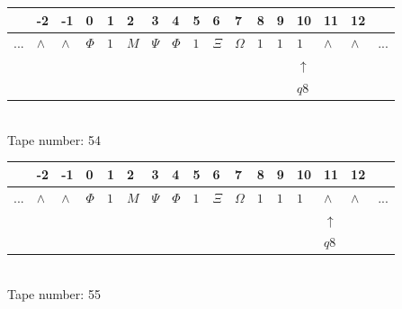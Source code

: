 \documentclass[11pt]{article}
\begin{document}
\begin{table}[H]
\centering
\begin{tabular}{lllllllllllllllll}
 & -2 & -1 & 0 & 1 & 2 & 3 & 4 & 5 & 6 & 7 & 8 & 9 & 10 & 11 & 12 & \\
\hline
$...$ & \multicolumn{1}{|l|}{$\wedge$} & \multicolumn{1}{|l|}{$\wedge$} & \multicolumn{1}{|l|}{$\Phi$} & \multicolumn{1}{|l|}{$1$} & \multicolumn{1}{|l|}{$M$} & \multicolumn{1}{|l|}{$\Psi$} & \multicolumn{1}{|l|}{$\Phi$} & \multicolumn{1}{|l|}{$1$} & \multicolumn{1}{|l|}{$\Xi$} & \multicolumn{1}{|l|}{$\Omega$} & \multicolumn{1}{|l|}{$1$} & \multicolumn{1}{|l|}{$1$} & \multicolumn{1}{|l|}{$1$} & \multicolumn{1}{|l|}{$\wedge$} & \multicolumn{1}{|l|}{$\wedge$} & $...$\\
\hline
&  &  &  &  &  &  &  &  &  &  &  &  & $\uparrow$ &  &  &  \\
&  &  &  &  &  &  &  &  &  &  &  &  & $ q8 $ &  &  &  \\
\end{tabular}
\\
Tape number: 54
\noindent\makebox[\linewidth]{\hdashrule{\textwidth}{1pt}{1pt}}\end{table}

\begin{table}[H]
\centering
\begin{tabular}{lllllllllllllllll}
 & -2 & -1 & 0 & 1 & 2 & 3 & 4 & 5 & 6 & 7 & 8 & 9 & 10 & 11 & 12 & \\
\hline
$...$ & \multicolumn{1}{|l|}{$\wedge$} & \multicolumn{1}{|l|}{$\wedge$} & \multicolumn{1}{|l|}{$\Phi$} & \multicolumn{1}{|l|}{$1$} & \multicolumn{1}{|l|}{$M$} & \multicolumn{1}{|l|}{$\Psi$} & \multicolumn{1}{|l|}{$\Phi$} & \multicolumn{1}{|l|}{$1$} & \multicolumn{1}{|l|}{$\Xi$} & \multicolumn{1}{|l|}{$\Omega$} & \multicolumn{1}{|l|}{$1$} & \multicolumn{1}{|l|}{$1$} & \multicolumn{1}{|l|}{$1$} & \multicolumn{1}{|l|}{$\wedge$} & \multicolumn{1}{|l|}{$\wedge$} & $...$\\
\hline
&  &  &  &  &  &  &  &  &  &  &  &  &  & $\uparrow$ &  &  \\
&  &  &  &  &  &  &  &  &  &  &  &  &  & $ q8 $ &  &  \\
\end{tabular}
\\
Tape number: 55
\noindent\makebox[\linewidth]{\hdashrule{\textwidth}{1pt}{1pt}}\end{table}
\end{document}
